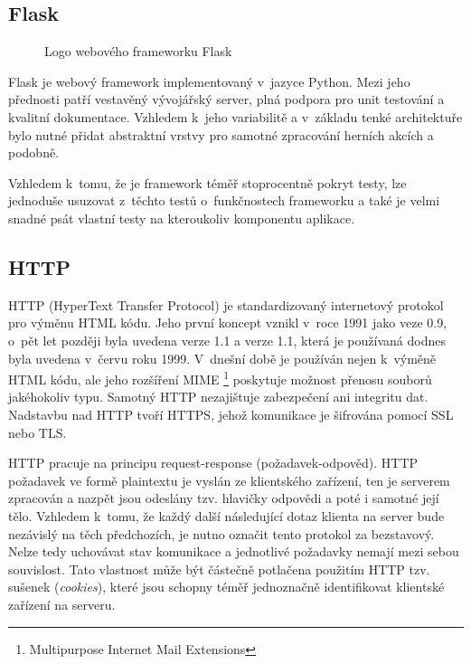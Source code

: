 \subsection{Flask}
\label{subsec:flask}
\begin{wrapfigure}[16]{R}{\textwidth/3}
    \centering
    
    \caption{Logo webového frameworku Flask}
\end{wrapfigure}

Flask je webový framework implementovaný v~jazyce Python. Mezi jeho přednosti patří vestavěný vývojářský server, plná podpora pro unit testování a kvalitní dokumentace. Vzhledem k~jeho variabilitě a v~základu tenké architektuře bylo nutné přidat abstraktní vrstvy pro samotné zpracování herních akcích a podobně.

Vzhledem k~tomu, že je framework téměř stoprocentně pokryt testy, lze jednoduše usuzovat z~těchto testů o~funkčnostech frameworku a také je velmi snadné psát vlastní testy na kteroukoliv komponentu aplikace.

\subsection{HTTP}
\label{subsec:http}
\begin{sloppypar}
	HTTP (HyperText Transfer Protocol) je standardizovaný internetový protokol pro výměnu HTML kódu. Jeho první koncept vznikl v~roce 1991 jako veze 0.9, o~pět let později byla uvedena verze 1.1 a verze 1.1, která je používaná dodnes byla uvedena v~červu roku 1999. V~dnešní době je používán nejen k~výměně HTML kódu, ale jeho rozšíření MIME \footnote{Multipurpose Internet Mail Extensions} poskytuje možnost přenosu souborů jakéhokoliv typu. Samotný HTTP nezajištuje zabezpečení ani integritu dat. Nadstavbu nad HTTP tvoří HTTPS, jehož komunikace je šifrována pomocí SSL nebo TLS.

	HTTP pracuje na principu request-response (požadavek-odpověd). HTTP požadavek ve formě plaintextu je vyslán ze klientského zařízení, ten je serverem zpracován a nazpět jsou odeslány tzv. hlavičky odpovědi a poté i samotné její tělo. Vzhledem k~tomu, že každý další následující dotaz klienta na server bude nezávislý na těch předchozích, je nutno označit tento protokol za bezstavový. Nelze tedy uchovávat stav komunikace a jednotlivé požadavky nemají mezi sebou souvislost. Tato vlastnost může být částečně potlačena použitím HTTP tzv. sušenek (\emph{cookies}), které jsou schopny téměř jednoznačně identifikovat klientské zařízení na serveru.
\end{sloppypar}

